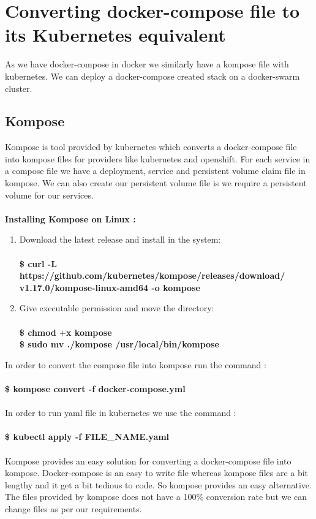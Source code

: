 \documentclass[12pt]{report}
\begin{document}
\section{Converting docker-compose file to its Kubernetes equivalent}
As we have docker-compose in docker we similarly have a kompose file with kubernetes. We can deploy a docker-compose created stack on a docker-swarm cluster. 
\subsection{Kompose}
Kompose is tool provided by kubernetes which converts a docker-compose file into kompose files for providers like kubernetes and openshift. For each service in a compose file we have a deployment, service and persistent volume claim file in kompose. We can also create our persistent volume file is we require a persistent volume for our services.\\\\
\textbf{Installing Kompose on Linux :}
\begin{enumerate}
	\item Download the latest release and install in the system:\\\\
	\textbf{\$ curl -L https://github.com/kubernetes/kompose/releases/download/\\v1.17.0/kompose-linux-amd64 -o kompose}
	\item Give executable permission and move the directory:\\\\
	\textbf{\$ chmod $+$x kompose\\
		\$ sudo mv ./kompose /usr/local/bin/kompose}
\end{enumerate}
In order to convert the compose file into kompose run the command :\\\\
\textbf{\$ kompose convert -f docker-compose.yml}\\\\
In order to run yaml file in kubernetes we use the command :\\\\
\textbf{\$ kubectl apply -f FILE\_NAME.yaml}\\\\
Kompose provides an easy solution for  converting a docker-compose file into kompose. Docker-compose is an easy to write file whereas kompose files are a bit lengthy and it get a bit tedious to code. So kompose provides an easy alternative. The files provided by kompose does not have a 100\% conversion rate but we can change files as per our requirements.\\\\
\end{document}
